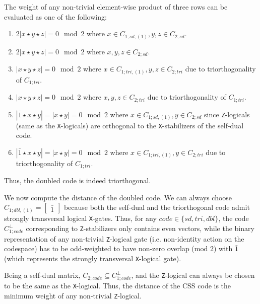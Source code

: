 \documentclass[journal]{IEEEtran}
\newcommand{\X}{\texttt{X}}
\newcommand{\Z}{\texttt{Z}}
\begin{document}
 The weight of any non-trivial element-wise product of three rows can be evaluated as one of the following:
\begin{enumerate}
    \item $2|x\star y \star z|=0\mod{2}$ where $x\in C_{1;sd,(1)},y,z\in C_{2;sd}$.
    \item $2|x\star y \star z|=0\mod{2}$ where $x,y,z\in C_{2;sd}$.
    \item $|x\star y \star z|=0\mod{2}$ where $x\in C_{1;tri,(1)},y,z\in C_{2;tri}$ due to triorthogonality of $C_{1;tri}$.
    \item  $|x\star y \star z|=0\mod{2}$ where $x,y,z\in C_{2;tri}$ due to triorthogonality of $C_{1;tri}$.
    \item $|\bar{1}\star x \star y|= |x\star y| = 0\mod{2}$ where $x\in C_{1;sd,(1)},y\in C_{2;sd}$ since \Z-logicals (same as the \X-logicals) are orthogonal to the \X-stabilizers of the self-dual code.
    \item $|\bar{1}\star x \star y|= |x\star y| = 0\mod{2}$ where $x\in C_{1;tri,(1)},y\in C_{2;tri}$ due to triorthogonality of $C_{1;tri}$.
\end{enumerate}


Thus, the doubled code is indeed triorthogonal. 

We now compute the distance of the doubled code.
We can always choose $C_{1;dbl,(1)}= \begin{bmatrix}\bar{1}\end{bmatrix}$ because both the self-dual and the triorthogonal code admit strongly transversal logical \X-gates. Thus, for any $code \in \{sd,tri,dbl\}$, the code $C^{\perp}_{1;code}$ corresponding to \Z-stabilizers only contains even vectors, while the binary representation of any non-trivial \Z-logical gate (i.e. non-identity action on the codespace) has to be odd-weighted to have non-zero overlap ($\textrm{mod } 2$) with $\bar{1}$ (which represents the strongly transversal \X-logical gate).

Being a self-dual matrix, $C_{2;code}\subseteq C^{\perp}_{1;code}$, and the \Z-logical can always be chosen to be the same as the \X-logical. Thus, the distance of the CSS code is the minimum weight of any non-trivial \Z-logical.
\end{document}
